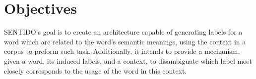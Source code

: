\section{Objectives}

\ac{SENTIDO}'s goal is to create an architecture capable of generating
labels for a word which are related to the word's semantic meanings, using the
context in a corpus to preform such task. Additionally, it intends to provide a
mechanism, given a word, its induced labels, and a context, to disambiguate
which label most closely corresponds to the usage of the word in this context.


